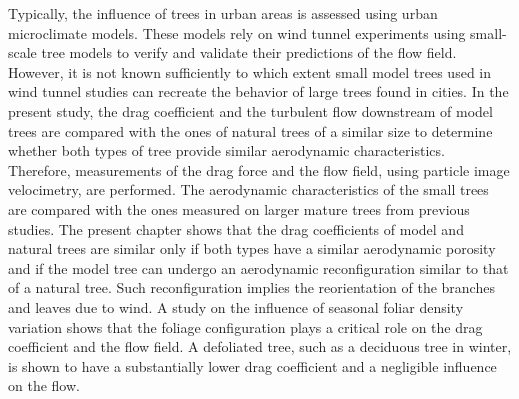 Typically, the influence of trees in urban areas is assessed using urban microclimate models. These models rely on wind tunnel experiments using small-scale tree models to verify and validate their predictions of the flow field. However, it is not known sufficiently to which extent small model trees used in wind tunnel studies can recreate the behavior of large trees found in cities. In the present study, the drag coefficient and the turbulent flow downstream of model trees are compared with the ones of natural trees of a similar size to determine whether both types of tree provide similar aerodynamic characteristics. Therefore, measurements of the drag force and the flow field, using particle image velocimetry, are performed. The aerodynamic characteristics of the small trees are compared with the ones measured on larger mature trees from previous studies. The present chapter shows that the drag coefficients of model and natural trees are similar only if both types have a similar aerodynamic porosity and if the model tree can undergo an aerodynamic reconfiguration similar to that of a natural tree. Such reconfiguration implies the reorientation of the branches and leaves due to wind. A study on the influence of seasonal foliar density variation shows that the foliage configuration plays a critical role on the drag coefficient and the flow field. A defoliated tree, such as a deciduous tree in winter, is shown to have a substantially lower drag coefficient and a negligible influence on the flow.


